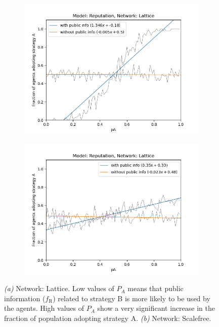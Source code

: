\documentclass[11pt, A4 paper, twocolumn ]{article}
\newcommand{\fr}{$ f_{\text{R}} $}
\begin{document}
\begin{figure}[h]
	\centering
	\begin{subfigure}[b]{0.4\textwidth}
		\centering
		\includegraphics[width=\textwidth]{graphs/lat-pAvsnormal}
		\caption{}
		\label{fig:lat-pA}
	\end{subfigure}
	\begin{subfigure}[b]{0.4\textwidth}
		\centering
		\includegraphics[width=\textwidth]{graphs/sf-pAvsnormal}
		\caption{}
		\label{fig:sf-pA}
	\end{subfigure}
	\caption{\footnotesize \textit{(a)} Network: Lattice. Low values of $ P_{A} $ means that public information (\fr) related to strategy B is more likely to be used by the agents. High values of $ P_{A} $ show a very significant increase in the fraction of population adopting strategy A. \textit{(b)} Network: Scalefree. }
	\label{fig:opdyn}
\end{figure}
\end{document}

